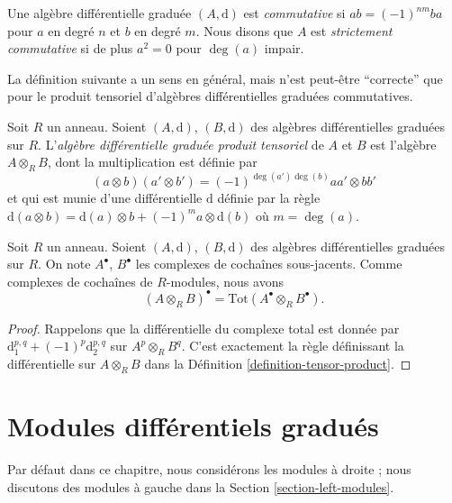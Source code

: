 \begin{definition}
\label{definition-cdga}
Une algèbre différentielle graduée $(A, \text{d})$ est {\it commutative} si $ab =
(-1)^{nm}ba$ pour $a$ en degré $n$ et $b$ en degré $m$. Nous disons que $A$ est
{\it strictement commutative} si de plus $a^2 = 0$ pour $\deg(a)$ impair.
\end{definition}

\noindent
La définition suivante a un sens en général, mais n'est peut-être ``correcte''
que pour le produit tensoriel d'algèbres différentielles graduées commutatives.

\begin{definition}
\label{definition-tensor-product}
Soit $R$ un anneau. Soient $(A, \text{d})$, $(B, \text{d})$ des algèbres
différentielles graduées sur $R$. L'{\it algèbre différentielle graduée produit
tensoriel} de $A$ et $B$ est l'algèbre $A \otimes_R B$, dont la multiplication
est définie par
$$
(a \otimes b)(a' \otimes b') = (-1)^{\deg(a')\deg(b)} aa' \otimes bb'
$$
et qui est munie d'une différentielle $\text{d}$ définie par la règle $\text{d}(a \otimes
b) = \text{d}(a) \otimes b + (-1)^m a \otimes \text{d}(b)$ où $m = \deg(a)$.
\end{definition}

\begin{lemma}
\label{lemma-total-complex-tensor-product}
Soit $R$ un anneau. Soient $(A, \text{d})$, $(B, \text{d})$ des algèbres
différentielles graduées sur $R$. On note $A^\bullet$, $B^\bullet$ les complexes
de cochaînes sous-jacents. Comme complexes de cochaînes de $R$-modules, nous avons
$$
(A \otimes_R B)^\bullet = \text{Tot}(A^\bullet \otimes_R B^\bullet).
$$
\end{lemma}

\begin{proof}
Rappelons que la différentielle du complexe total est donnée par $\text{d}_1^{p,
q} + (-1)^p \text{d}_2^{p, q}$ sur $A^p \otimes_R B^q$. C'est exactement la
règle définissant la différentielle sur $A \otimes_R B$ dans la Définition
\ref{definition-tensor-product}.
\end{proof}






\section{Modules différentiels gradués}
\label{section-modules}

\noindent
Par défaut dans ce chapitre, nous considérons les modules à droite ; nous
discutons des modules à gauche dans la Section \ref{section-left-modules}.

